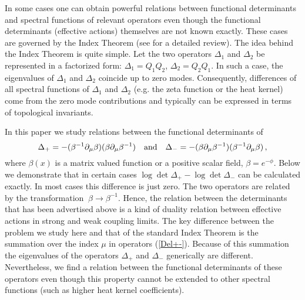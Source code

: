 \documentclass[a4paper,12pt]{article}
\begin{document}
In some cases one can obtain powerful relations between
functional determinants and spectral functions of relevant
operators even though the functional determinants (effective
actions) themselves are not known exactly. 
These cases are governed by the Index Theorem (see 
\cite{Gilkey95,EGH} for a detailed review).
The idea behind the Index Theorem is quite
simple. Let the two operators $\Delta_1$ and $\Delta_2$
be represented in a factorized form: $\Delta_1=Q_1Q_2$,
$\Delta_2=Q_2Q_1$. In such a case, the eigenvalues of 
$\Delta_1$ and $\Delta_2$ coincide up to zero modes.
Consequently, differences of all spectral functions
of $\Delta_1$ and $\Delta_2$ (e.g. the zeta function or
the heat kernel) come from  the zero mode contributions
and typically can be expressed in terms of topological invariants.

In this paper we study relations between the functional
determinants of
\begin{equation}
\Delta_+=-(\beta^{-1}\partial_\mu \beta )
(\beta \partial_\mu \beta^{-1})\quad {\rm and}\quad
\Delta_-=-(\beta \partial_\mu \beta^{-1})
(\beta^{-1}\partial_\mu \beta )\,, \label{Del+-}
\end{equation}
where $\beta (x)$ is a matrix valued function or a
positive scalar field, $\beta =e^{-\phi}$. Below we
demonstrate that in certain cases $\log \det \Delta_+-
\log \det \Delta_-$ can be calculated exactly. In
most cases this difference is just zero.
The two operators are related by the transformation 
$~\beta \to \beta^{-1}$.
Hence, the relation between the determinants that has been
advertised above is a kind of duality relation between
effective actions in strong and weak coupling limits.
The key difference between the problem we study here and  
that of the standard Index Theorem is
the summation over the index $\mu$ in operators (\ref{Del+-}).
Because of this summation the eigenvalues of the operators 
$\Delta_+$ and $\Delta_-$ generically are different. 
Nevertheless, we find a relation between
the functional determinants of these operators even though
this property cannot be extended to other
spectral functions (such as higher heat kernel
coefficients). 
\end{document}
